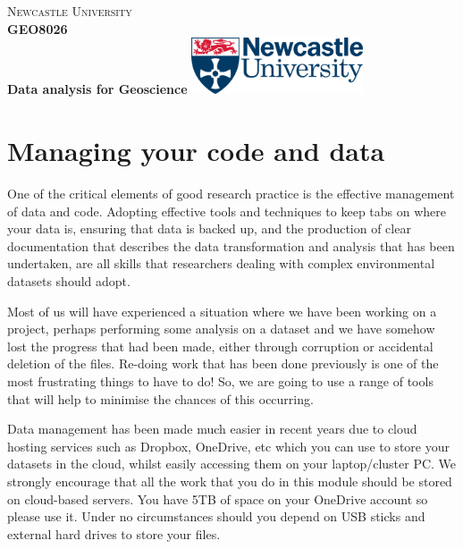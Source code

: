 \documentclass[11pt,onecolumn,a4paper,notitlepage]{article}
\begin{document}


\begin{tcolorbox}[ halign upper=flush center] %
	\large \textsc{Newcastle University}
	\vspace{0.25cm}
	\\
	{\huge {\textbf{GEO8026}}}
	\\
	\vspace{0.25cm}
	\textbf{Data analysis for Geoscience}
	\tcblower  %
	\includegraphics[width=2in]{logo.png}
\end{tcolorbox}

\noindent\makebox[\linewidth]{\rule{\textwidth}{0.4pt}} 


\section{Managing your code and data}

One of the critical elements of good research practice is the effective management of data and code. Adopting effective tools and techniques to keep tabs on where your data is, ensuring that data is backed up, and the production of clear documentation that describes the data transformation and analysis that has been undertaken, are all skills that researchers dealing with complex environmental datasets should adopt.

Most of us will have experienced a situation where we have been working on a project, perhaps performing some analysis on a dataset and we have somehow lost the progress that had been made, either through corruption or accidental deletion of the files. Re-doing work that has been done previously is one of the most frustrating things to have to do! So, we are going to use a range of tools that will help to minimise the chances of this occurring.

Data management has been made much easier in recent years due to cloud hosting services such as Dropbox, OneDrive, etc which you can use to store your datasets in the cloud, whilst easily accessing them on your laptop/cluster PC. We strongly encourage that all the work that you do in this module should be stored on cloud-based servers. You have 5TB of space on your OneDrive account so please use it. Under no circumstances should you depend on USB sticks and external hard drives to store your files.
\end{document}
